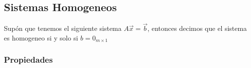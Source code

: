 \documentclass[12pt, fleqn]{report}                             %
\theoremstyle{break}                                            %
\begin{document}
            \clearpage
            \subsection{Sistemas Homogeneos}
            
                Supón que tenemos el siguiente sistema $A \vec x = \vec b$, entonces decimos que el sistema
                es homogeneo si y solo si $b = 0_{m \times 1}$

                \vspace{1em}
                \subsubsection{Propiedades}
\end{document}
